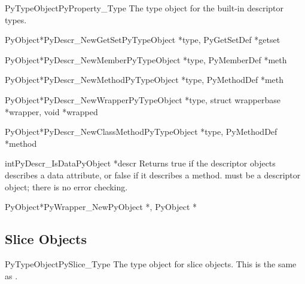 \begin{cvardesc}{PyTypeObject}{PyProperty_Type}
  The type object for the built-in descriptor types.
\end{cvardesc}

\begin{cfuncdesc}{PyObject*}{PyDescr_NewGetSet}{PyTypeObject *type,
					        PyGetSetDef *getset}
\end{cfuncdesc}

\begin{cfuncdesc}{PyObject*}{PyDescr_NewMember}{PyTypeObject *type,
					        PyMemberDef *meth}
\end{cfuncdesc}

\begin{cfuncdesc}{PyObject*}{PyDescr_NewMethod}{PyTypeObject *type,
                                                PyMethodDef *meth}
\end{cfuncdesc}

\begin{cfuncdesc}{PyObject*}{PyDescr_NewWrapper}{PyTypeObject *type,
						 struct wrapperbase *wrapper,
                                                 void *wrapped}
\end{cfuncdesc}

\begin{cfuncdesc}{PyObject*}{PyDescr_NewClassMethod}{PyTypeObject *type,
						     PyMethodDef *method}
\end{cfuncdesc}

\begin{cfuncdesc}{int}{PyDescr_IsData}{PyObject *descr}
  Returns true if the descriptor objects  describes a data
  attribute, or false if it describes a method.   must be a
  descriptor object; there is no error checking.
\end{cfuncdesc}

\begin{cfuncdesc}{PyObject*}{PyWrapper_New}{PyObject *, PyObject *}
\end{cfuncdesc}


\subsection{Slice Objects \label{slice-objects}}

\begin{cvardesc}{PyTypeObject}{PySlice_Type}
  The type object for slice objects.  This is the same as
  .
\end{cvardesc}

